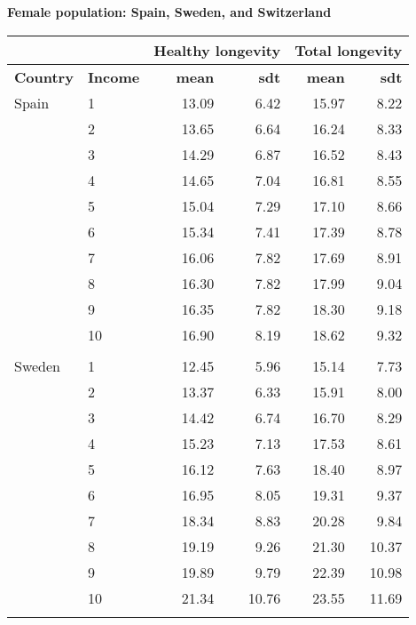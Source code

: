 \begin{table}
\centering \textbf{Female population: Spain, Sweden, and Switzerland}\par\medskip\medskip
\begin{tabular}{llrrrr}
\toprule
& & \multicolumn{2}{l}{Healthy longevity} & \multicolumn{2}{l}{Total longevity} \\
\midrule
\textbf{Country }& \textbf{Income} &  \textbf{mean}       &  \textbf{sdt}     &     \textbf{mean}         & \textbf{sdt}    \\
\midrule
Spain & 1  &   13.09 &   6.42 &  15.97 &   8.22 \\
            & 2  &   13.65 &   6.64 &  16.24 &   8.33 \\
            & 3  &   14.29 &   6.87 &  16.52 &   8.43 \\
            & 4  &   14.65 &   7.04 &  16.81 &   8.55 \\
            & 5  &   15.04 &   7.29 &  17.10 &   8.66 \\
            & 6  &   15.34 &   7.41 &  17.39 &   8.78 \\
            & 7  &   16.06 &   7.82 &  17.69 &   8.91 \\
            & 8  &   16.30 &   7.82 &  17.99 &   9.04 \\
            & 9  &   16.35 &   7.82 &  18.30 &   9.18 \\
            & 10 &   16.90 &   8.19 &  18.62 &   9.32 \\
                 & &    &   &   &  \\
Sweden & 1  &   12.45 &   5.96 &  15.14 &   7.73 \\
            & 2  &   13.37 &   6.33 &  15.91 &   8.00 \\
            & 3  &   14.42 &   6.74 &  16.70 &   8.29 \\
            & 4  &   15.23 &   7.13 &  17.53 &   8.61 \\
            & 5  &   16.12 &   7.63 &  18.40 &   8.97 \\
            & 6  &   16.95 &   8.05 &  19.31 &   9.37 \\
            & 7  &   18.34 &   8.83 &  20.28 &   9.84 \\
            & 8  &   19.19 &   9.26 &  21.30 &  10.37 \\
            & 9  &   19.89 &   9.79 &  22.39 &  10.98 \\
            & 10 &   21.34 &  10.76 &  23.55 &  11.69 \\
                 & &    &   &   &  \\

\end{tabular}
\end{table}
